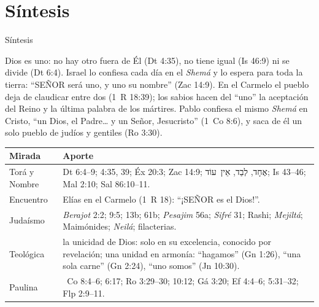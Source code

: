 \documentclass[hyperref={bookmarks=false},aspectratio=169]{beamer}
\newcommand{\heb}[1]{\mbox{\foreignlanguage{hebrew}{#1}}}
\newcommand{\SENOR}{S{\fontsize{0.78em}{1em}\selectfont EÑOR}}
\begin{document}
\section{Síntesis}

\begin{frame}{Síntesis}
\begin{tcolorbox}[colback=papiro,colframe=azul,boxrule=1pt,arc=3pt]
\footnotesize Dios es uno: no hay otro fuera de Él (Dt 4:35), no tiene igual (Is 46:9) ni se divide (Dt 6:4). Israel lo confiesa cada día en el \emph{Shemá} y lo espera para toda la tierra: ``\SENOR{} será uno, y uno su nombre'' (Zac 14:9). En el Carmelo el pueblo deja de claudicar entre dos (1~R 18:39); los sabios hacen del ``uno'' la aceptación del Reino y la última palabra de los mártires. Pablo confiesa el mismo \emph{Shemá} en Cristo, ``un Dios, el Padre\ldots{} y un Señor, Jesucristo'' (1~Co 8:6), y saca de él un solo pueblo de judíos y gentiles (Ro 3:30).
\end{tcolorbox}
\scriptsize\renewcommand{\arraystretch}{1.12}
\begin{tabular}{@{}>{\RaggedRight\arraybackslash}p{2.0cm}>{\RaggedRight\arraybackslash}p{9.8cm}@{}}
\toprule
\textbf{Mirada} & \textbf{Aporte} \\ \midrule
Torá y Nombre & Dt 6:4--9; 4:35, 39; Éx 20:3; Zac 14:9; \heb{אֶחָד}, \heb{לְבַד}, \heb{אֵין עוֹד}; Is 43--46; Mal 2:10; Sal 86:10--11. \\
Encuentro & Elías en el Carmelo (1~R 18): ``¡\SENOR{} es el Dios!''. \\
Judaísmo & \emph{Berajot} 2:2; 9:5; 13b; 61b; \emph{Pesajim} 56a; \emph{Sifré} 31; Rashi; \emph{Mejiltá}; Maimónides; \emph{Neilá}; filacterias. \\
Teológica & la unicidad de Dios: solo en su excelencia, conocido por revelación; una unidad en armonía: ``hagamos'' (Gn 1:26), ``una sola carne'' (Gn 2:24), ``uno somos'' (Jn 10:30). \\
Paulina & 1~Co 8:4--6; 6:17; Ro 3:29--30; 10:12; Gá 3:20; Ef 4:4--6; 5:31--32; Flp 2:9--11. \\
\bottomrule
\end{tabular}
\end{frame}
\end{document}

